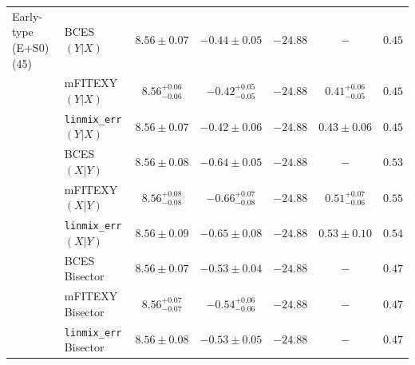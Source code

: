 \documentclass[preprint2]{emulateapj}
\begin{document}
\begin{table}
\begin{tabular}{llccccc}
 Early-type (E+S0) (45) & BCES $(Y|X)$   & $8.56 \pm 0.07$ & $-0.44 \pm 0.05$ & $-24.88$ & $-$ & $0.45$ \\
                        & mFITEXY $(Y|X)$  & $8.56^{+0.06}_{-0.06}$ & $-0.42^{+0.05}_{-0.05}$ & $-24.88$ & $0.41^{+0.06}_{-0.05}$ & $0.45$ \\
                        & {\tt linmix\_err} $(Y|X)$  & $8.56 \pm 0.07$ & $-0.42 \pm 0.06$ & $-24.88$ & $0.43 \pm 0.06$ & $0.45$ \\ [0.5em]
                        & BCES $(X|Y)$   & $8.56 \pm 0.08$ & $-0.64 \pm 0.05$ & $-24.88$ & $-$ & $0.53$ \\
                        & mFITEXY $(X|Y)$  & $8.56^{+0.08}_{-0.08}$ & $-0.66^{+0.07}_{-0.08}$ & $-24.88$ & $0.51^{+0.07}_{-0.06}$ & $0.55$ \\
                        & {\tt linmix\_err} $(X|Y)$  & $8.56 \pm 0.09$ & $-0.65 \pm 0.08$ & $-24.88$ & $0.53 \pm 0.10$ & $0.54$ \\ [0.5em]
                        & BCES Bisector  & $8.56 \pm 0.07$ & $-0.53 \pm 0.04$ & $-24.88$ & $-$ & $0.47$ \\
                        & mFITEXY Bisector & $8.56^{+0.07}_{-0.07}$ & $-0.54^{+0.06}_{-0.06}$ & $-24.88$ & $-$    & $0.47$ \\
                        & {\tt linmix\_err} Bisector & $8.56 \pm 0.08$ & $-0.53 \pm 0.05$ & $-24.88$ & $-$    & $0.47$ \\ [0.5em]



\end{tabular}
\end{table}
\end{document}
